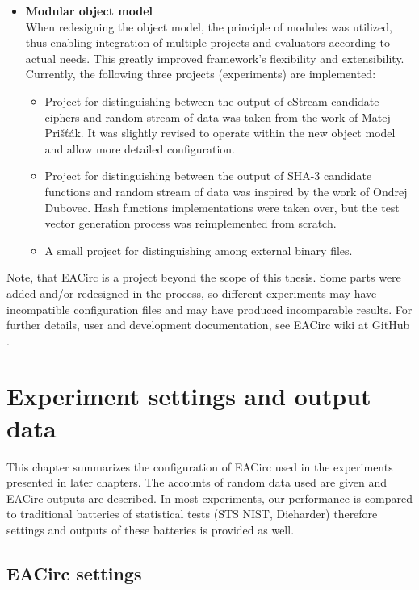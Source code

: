 \documentclass[12pt,oneside]{fithesis2}
\begin{document}
\begin{itemize}
\item \textbf{Modular object model}\\
When redesigning the object model, the principle of modules was utilized, thus enabling integration of multiple projects 
and evaluators according to actual needs. This greatly improved framework's flexibility and extensibility.
Currently, the following three projects (experiments) are implemented:
\begin{itemize}
\item Project for distinguishing between the output of eStream candidate ciphers and random stream of data was taken from the work of 
Matej Prišťák.
It was slightly revised to operate within the new object model and allow more detailed configuration.
\item Project for distinguishing between the output of SHA-3 candidate functions and random stream of data was inspired by the work of 
Ondrej Dubovec.
Hash functions implementations were taken over, but the test vector generation process was reimplemented from scratch. 
\item A small project for distinguishing among external binary files.
\end{itemize}
\end{itemize}

\noindent
Note, that EACirc is a project beyond the scope of this thesis. Some parts were added and/or redesigned in the process, so
different experiments may have incompatible configuration files and may have produced incomparable results.
For further details, user and development documentation, see EACirc wiki at GitHub \cite{eacirc-github}.	

\chapter{Experiment settings and output data}
\label{chap:settings}

This chapter summarizes the configuration of EACirc used in the experiments presented in later chapters.
The accounts of random data used are given and EACirc outputs are described. 
In most experiments, our performance is compared to traditional batteries of statistical tests (STS NIST, Dieharder)
therefore settings and outputs of these batteries is provided as well.

\section{EACirc settings}
\label{sec:settings-eacirc}
\end{document}
